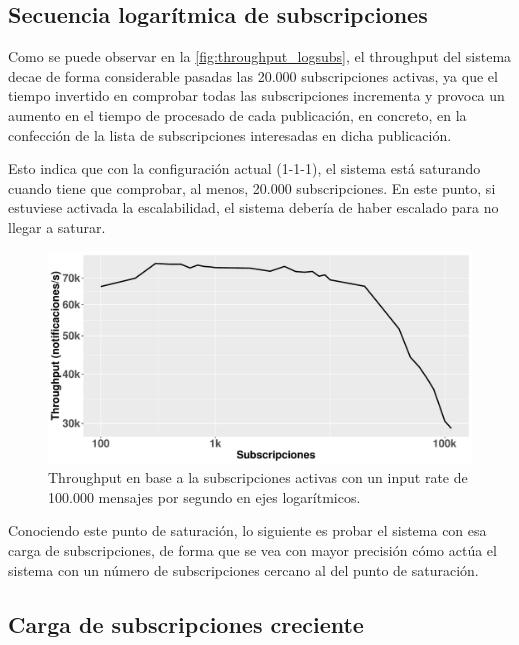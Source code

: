 
\subsection*{Secuencia logarítmica de subscripciones}

Como se puede observar en la \autoref{fig:throughput_logsubs}, el throughput 
del sistema decae de forma considerable pasadas las 20.000 subscripciones 
activas, ya que el tiempo invertido en comprobar todas las subscripciones 
incrementa y provoca un aumento en el tiempo de procesado de cada publicación,
en concreto, en la confección de la lista de subscripciones interesadas en
dicha publicación.

Esto indica que con la configuración actual (1-1-1), el sistema está saturando
cuando tiene que comprobar, al menos, 20.000 subscripciones. En este punto, si
estuviese activada la escalabilidad, el sistema debería de haber escalado para
no llegar a saturar.

\begin{figure}[htpb]
    \centering
    \includegraphics[width=\textwidth]{images/log-subs/throughput_logsubs_IR-100k.pdf}
    \caption{Throughput en base a la subscripciones activas con un input rate de 100.000 mensajes por segundo en ejes logarítmicos.}
    \label{fig:throughput_logsubs}
\end{figure}

Conociendo este punto de saturación, lo siguiente es probar el sistema con esa
carga de subscripciones, de forma que se vea con mayor precisión cómo actúa el
sistema con un número de subscripciones cercano al del punto de saturación.


\subsection*{Carga de subscripciones creciente}

